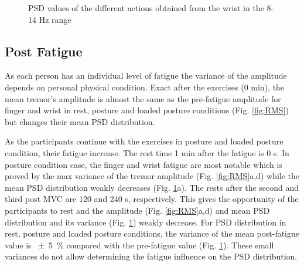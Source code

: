 \documentclass[conference, a4paper]{IEEEtran}
\begin{document}
\begin{figure}[h!]
	\centering
	\label{fig:wrist_PC_PSD}
	\hfill
	\label{fig:wrist_RC_PSD}
	\hfill
	\label{fig:wrist_LPC_PSD}
	\caption{PSD values of the different actions obtained from the wrist in the 8-14 Hz range}
	\label{fig:PSD}
\end{figure}

\subsection{Post Fatigue}

As each person has an individual level of fatigue the variance of the amplitude depends on personal physical condition. Exact after the exercises (0 min), the mean tremor's amplitude is almost the same as the pre-fatigue amplitude for finger and wrist in rest, posture and loaded posture conditions (Fig. \ref{fig:RMS}) but changes their mean PSD distribution.

As the participants continue with the exercises in posture and loaded posture condition, their fatigue increase. The rest time 1 min after the fatigue is 0 s. In posture condition case, the finger and wrist fatigue are most notable which is proved by the max variance of the tremor amplitude (Fig. \ref{fig:RMS}a,d) while the mean PSD distribution weakly decreases (Fig. \ref{fig:PSD}a).  The rests after the second and third post MVC are 120 and 240 s, respectively. This gives the opportunity of the participants to rest and the amplitude (Fig. \ref{fig:RMS}a,d) and mean PSD distribution and its variance (Fig. \ref{fig:PSD}) weakly decrease.
For PSD distribution in rest, posture and loaded posture conditions, the variance of the mean post-fatigue value is \SI{\pm 5}{\percent} compared with the pre-fatigue value (Fig. \ref{fig:PSD}). These small variances do not allow determining the fatigue influence on the PSD distribution.
\end{document}
